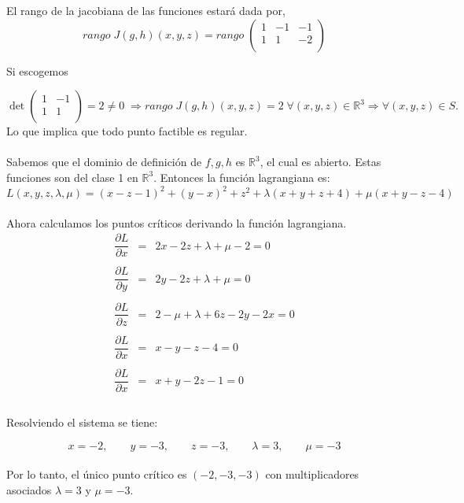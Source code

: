 \begin{enumerate}
\begin{enumerate}[\bfseries a)]
		El rango de la jacobiana de las funciones estará dada por,
		$$rango\; J(g,h)(x,y,z)=rango\;\begin{pmatrix}
		    1&-1&-1\\
		    1&1&-2\\
		\end{pmatrix}$$

		Si escogemos 

		$$\det \begin{pmatrix}
		    1&-1\\
		     1&1\\
		 \end{pmatrix} = 2 \neq 0\; \Longrightarrow rango\; J(g,h)(x,y,z)=2\; \forall(x,y,z)\in \mathbb{R}^3 \Longrightarrow \forall(x,y,z)\in S.$$
		  Lo que implica que todo punto factible es regular.\\\\

		Sabemos que el dominio de definición de $f,g,h$ es $\mathbb{R}^3$, el cual es abierto. Estas funciones son del clase 1 en $\mathbb{R}^3$. Entonces la función lagrangiana es:\\
		$$L(x,y,z,\lambda,\mu) = (x-z-1)^2+(y-x)^2 + z^2 + \lambda(x+y+z+4)+\mu(x+y-z-4)$$\\
		
		Ahora calculamos los puntos críticos derivando la función lagrangiana.\\

		$$\begin{array}{rcl}
		    \dfrac{\partial L}{\partial x}&=&2x-2z+\lambda + \mu -2 = 0\\\\
		    \dfrac{\partial L}{\partial y}&=&2y-2z+\lambda + \mu = 0\\\\
		    \dfrac{\partial L}{\partial z}&=&2-\mu + \lambda +6z-2y-2x=0\\\\
		    \dfrac{\partial L}{\partial x}&=&x-y-z-4=0\\\\
		    \dfrac{\partial L}{\partial x}&=&x+y-2z-1=0\\\\
		\end{array}$$

		Resolviendo el sistema se tiene:

		$$x=-2,\qquad y=-3,\qquad z=-3,\qquad \lambda=3,\qquad \mu = -3$$\\

		Por lo tanto, el único punto crítico es $\left(-2,-3,-3\right)$ con multiplicadores asociados $\lambda=3$ y $\mu=-3$.\\\\


\end{enumerate}
\end{enumerate}

